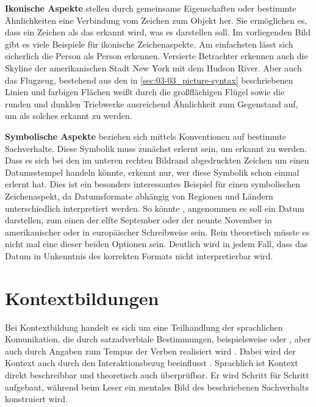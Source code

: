 \textbf{Ikonische Aspekte} stellen durch gemeinsame Eigenschaften oder bestimmte Ähnlichkeiten eine Verbindung vom Zeichen zum Objekt her. Sie ermöglichen es, dass ein Zeichen als das erkannt wird, was es darstellen soll. \cite[S. 11]{001_MKO02_media-as-means-of-communication} Im vorliegenden Bild gibt es viele Beispiele für ikonische Zeichenaspekte. Am einfachsten lässt sich sicherlich die Person als Person erkennen. Versierte Betrachter erkennen auch die Skyline der amerikanischen Stadt New York mit dem Hudson River. Aber auch das Flugzeug, bestehend aus den in \autoref{sec:03-03_picture-syntax} beschriebenen Linien und farbigen Flächen weißt durch die großflächigen Flügel sowie die runden und dunklen Triebwerke ausreichend Ähnlichkeit zum Gegenstand  auf, um als solches erkannt zu werden.

\textbf{Symbolische Aspekte} beziehen sich mittels Konventionen auf bestimmte Sachverhalte. Diese Symbolik muss zunächst erlernt sein, um erkannt zu werden. \cite[S. 12]{001_MKO02_media-as-means-of-communication} Dass es sich bei den im unteren rechten Bildrand abgedruckten Zeichen um einen Datumsstempel handeln könnte, erkennt nur, wer diese Symbolik schon einmal erlernt hat. Dies ist ein besonders interessantes Beispiel für einen symbolischen Zeichenaspekt, da Datumsformate abhängig von Regionen und Ländern unterschiedlich interpretiert werden. So könnte , angenommen es soll ein Datum darstellen, zum einen der elfte September oder der neunte November in amerikanischer oder in europäischer Schreibweise sein. Rein theoretisch müsste es nicht mal eine dieser beiden Optionen sein. Deutlich wird in jedem Fall, dass das Datum in Unkenntnis des korrekten Formats nicht interpretierbar wird.

\section{Kontextbildungen}
\label{sec:03-05_context-formations}

Bei Kontextbildung handelt es sich um eine Teilhandlung der sprachlichen Komunikation, die durch satzadverbiale Bestimmungen, beispielsweise  oder , aber auch durch Angaben zum Tempus der Verben realisiert wird \cite[S. 23 f.]{001_MKO02_media-as-means-of-communication}. Dabei wird der Kontext auch durch den Interaktionsbezug beeinflusst \cite[S. 22]{001_MKO02_media-as-means-of-communication}. Sprachlich ist Kontext direkt beschreibbar und theoretisch auch überprüfbar. Er wird Schritt für Schritt aufgebaut, während beim Leser ein mentales Bild des beschriebenen Sachverhalts konstruiert wird.

